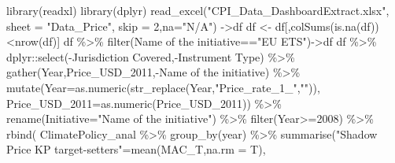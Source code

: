 \documentclass[
  letterpaper,
  DIV=11,
  numbers=noendperiod]{scrartcl}
\newenvironment{Shaded}{\begin{snugshade}}{\end{snugshade}}
\newcommand{\AttributeTok}[1]{\textcolor[rgb]{0.40,0.46,0.14}{#1}}
\newcommand{\DecValTok}[1]{\textcolor[rgb]{0.68,0.00,0.00}{#1}}
\newcommand{\FunctionTok}[1]{\textcolor[rgb]{0.28,0.35,0.67}{#1}}
\newcommand{\NormalTok}[1]{\textcolor[rgb]{0.00,0.46,0.62}{#1}}
\newcommand{\OtherTok}[1]{\textcolor[rgb]{0.00,0.46,0.62}{#1}}
\newcommand{\SpecialCharTok}[1]{\textcolor[rgb]{0.37,0.37,0.37}{#1}}
\newcommand{\StringTok}[1]{\textcolor[rgb]{0.13,0.47,0.30}{#1}}
\begin{document}
\begin{Shaded}
\begin{Highlighting}[]
\FunctionTok{library}\NormalTok{(readxl)}
\FunctionTok{library}\NormalTok{(dplyr)}
\FunctionTok{read\_excel}\NormalTok{(}\StringTok{"CPI\_Data\_DashboardExtract.xlsx"}\NormalTok{,}
           \AttributeTok{sheet =} \StringTok{"Data\_Price"}\NormalTok{,}
           \AttributeTok{skip =} \DecValTok{2}\NormalTok{,}\AttributeTok{na=}\StringTok{"N/A"}\NormalTok{) }\OtherTok{{-}\textgreater{}}\NormalTok{df}
\NormalTok{df }\OtherTok{\textless{}{-}}\NormalTok{ df[,}\FunctionTok{colSums}\NormalTok{(}\FunctionTok{is.na}\NormalTok{(df))}\SpecialCharTok{\textless{}}\FunctionTok{nrow}\NormalTok{(df)]}
\NormalTok{df }\SpecialCharTok{\%\textgreater{}\%} \FunctionTok{filter}\NormalTok{(}\StringTok{\textasciigrave{}}\AttributeTok{Name of the initiative}\StringTok{\textasciigrave{}}\SpecialCharTok{==}\StringTok{"EU ETS"}\NormalTok{)}\OtherTok{{-}\textgreater{}}\NormalTok{df}
\NormalTok{df }\SpecialCharTok{\%\textgreater{}\%} 
\NormalTok{  dplyr}\SpecialCharTok{::}\FunctionTok{select}\NormalTok{(}\SpecialCharTok{{-}}\StringTok{\textasciigrave{}}\AttributeTok{Jurisdiction Covered}\StringTok{\textasciigrave{}}\NormalTok{,}\SpecialCharTok{{-}}\StringTok{\textasciigrave{}}\AttributeTok{Instrument Type}\StringTok{\textasciigrave{}}\NormalTok{) }\SpecialCharTok{\%\textgreater{}\%}
  \FunctionTok{gather}\NormalTok{(Year,Price\_USD\_2011,}\SpecialCharTok{{-}}\StringTok{\textasciigrave{}}\AttributeTok{Name of the initiative}\StringTok{\textasciigrave{}}\NormalTok{) }\SpecialCharTok{\%\textgreater{}\%}
  \FunctionTok{mutate}\NormalTok{(}\AttributeTok{Year=}\FunctionTok{as.numeric}\NormalTok{(}\FunctionTok{str\_replace}\NormalTok{(Year,}\StringTok{"Price\_rate\_1\_"}\NormalTok{,}\StringTok{""}\NormalTok{)),}
         \AttributeTok{Price\_USD\_2011=}\FunctionTok{as.numeric}\NormalTok{(Price\_USD\_2011)) }\SpecialCharTok{\%\textgreater{}\%}
  \FunctionTok{rename}\NormalTok{(}\AttributeTok{Initiative=}\StringTok{"Name of the initiative"}\NormalTok{) }\SpecialCharTok{\%\textgreater{}\%}
  \FunctionTok{filter}\NormalTok{(Year}\SpecialCharTok{\textgreater{}=}\DecValTok{2008}\NormalTok{) }\SpecialCharTok{\%\textgreater{}\%}
  \FunctionTok{rbind}\NormalTok{(}
\NormalTok{  ClimatePolicy\_anal }\SpecialCharTok{\%\textgreater{}\%} 
  \FunctionTok{group\_by}\NormalTok{(year) }\SpecialCharTok{\%\textgreater{}\%}
  \FunctionTok{summarise}\NormalTok{(}\StringTok{"Shadow Price KP target{-}setters"}\OtherTok{=}\FunctionTok{mean}\NormalTok{(MAC\_T,}\AttributeTok{na.rm =}\NormalTok{ T),          }

\end{Highlighting}
\end{Shaded}
\end{document}
